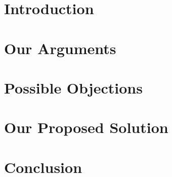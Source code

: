 \documentclass{article}
\title{\highlight{Net Neutrality}}
\author{Martijn Dwars\and
    Jason Raats\and
    Tim Rensen\and
    Rick Wieman\and
\\Delft University of Technology
\\\{M.T.Dwars, J.M.Raats, T.Rensen, R.Wieman\}@student.tudelft.nl
}
\date{\today}
\newcommand{\highlight}[1]{\hl{#1}}
\begin{document}
\maketitle
\thispagestyle{empty}

\begin{abstract}
\highlight{\ldots}

\textbf{Keywords}: net neutrality, \highlight{\ldots}
\end{abstract}

\section{Introduction}
\label{sec:intro}


\section{Our Arguments}
\label{sec:arguments}


\section{Possible Objections}
\label{sec:objections}


\section{Our Proposed Solution}
\label{sec:solution}


\section{Conclusion}
\label{sec:conclusion}




\end{document}
